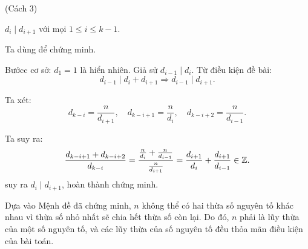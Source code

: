 \documentclass[../01-divisibility.tex]{subfiles}
\begin{document}
\begin{soln}(Cách 3)\footnotemark[\value{footnote}]
    \begin{claim*}
        \( d_i \mid d_{i+1} \) với mọi \( 1 \leq i \leq k-1 \).
    \end{claim*}
    \begin{subproof}
        Ta dùng  để chứng minh.
        
        Bướcc cơ sở: \( d_1 = 1 \) là hiển nhiên. Giả sử \( d_{i-1} \mid d_i \). Từ điều kiện đề bài:
        \[
            d_{i-1} \mid d_i + d_{i+1} \Rightarrow d_{i-1} \mid d_{i+1}.
        \]
        
        Ta xét:
        \[
            d_{k-i} = \frac{n}{d_{i+1}}, \quad d_{k-i+1} = \frac{n}{d_i}, \quad d_{k-i+2} = \frac{n}{d_{i-1}}.
        \]
        
        Ta suy ra:
        \[
            \frac{d_{k-i+1} + d_{k-i+2}}{d_{k-i}} = \frac{\frac{n}{d_i} + \frac{n}{d_{i-1}}}{\frac{n}{d_{i+1}}} = \frac{d_{i+1}}{d_i} + \frac{d_{i+1}}{d_{i-1}} \in \mathbb Z.
        \]
        suy ra \( d_i \mid d_{i+1} \), hoàn thành chứng minh.
    \end{subproof}

    Dựa vào Mệnh đề đã chứng minh, \( n \) không thể có hai thừa số nguyên tố khác nhau vì thừa số nhỏ nhất sẽ chia hết thừa số còn lại.
    Do đó, \( n \) phải là lũy thừa của một số nguyên tố, và các lũy thừa của số nguyên tố đều thỏa mãn điều kiện của bài toán.
\end{soln}

\end{document}
